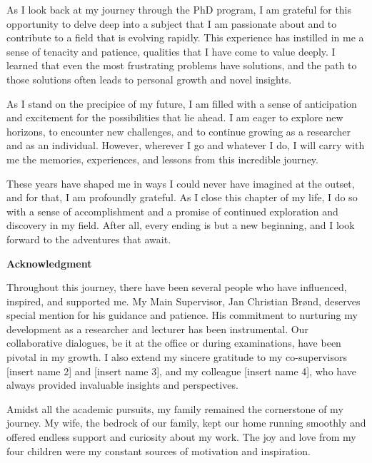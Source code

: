 As I look back at my journey through the PhD program, I am grateful for this opportunity to delve deep into a subject that I am passionate about and to contribute to a field that is evolving rapidly. This experience has instilled in me a sense of tenacity and patience, qualities that I have come to value deeply. I learned that even the most frustrating problems have solutions, and the path to those solutions often leads to personal growth and novel insights.

As I stand on the precipice of my future, I am filled with a sense of anticipation and excitement for the possibilities that lie ahead. I am eager to explore new horizons, to encounter new challenges, and to continue growing as a researcher and as an individual. However, wherever I go and whatever I do, I will carry with me the memories, experiences, and lessons from this incredible journey.

These years have shaped me in ways I could never have imagined at the outset, and for that, I am profoundly grateful. As I close this chapter of my life, I do so with a sense of accomplishment and a promise of continued exploration and discovery in my field. After all, every ending is but a new beginning, and I look forward to the adventures that await.

\newpage

  
\textsf{\textbf{\Large{Acknowledgment}}}

\vspace*{\baselineskip}

Throughout this journey, there have been several people who have influenced, inspired, and supported me. My Main Supervisor, Jan Christian Brønd, deserves special mention for his guidance and patience. His commitment to nurturing my development as a researcher and lecturer has been instrumental. Our collaborative dialogues, be it at the office or during examinations, have been pivotal in my growth. I also extend my sincere gratitude to my co-supervisors [insert name 2] and [insert name 3], and my colleague [insert name 4], who have always provided invaluable insights and perspectives.

Amidst all the academic pursuits, my family remained the cornerstone of my journey. My wife, the bedrock of our family, kept our home running smoothly and offered endless support and curiosity about my work. The joy and love from my four children were my constant sources of motivation and inspiration.

